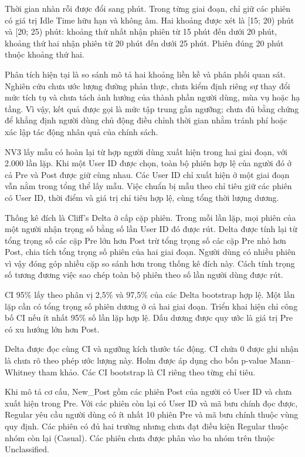 \documentclass[conference,a4paper]{IEEEtran}
\begin{document}
Thời gian nhàn rỗi được đổi sang phút. Trong từng giai đoạn, chỉ giữ các phiên có giá trị Idle Time hữu hạn và không âm. Hai khoảng được xét là [15; 20) phút và [20; 25) phút: khoảng thứ nhất nhận phiên từ 15 phút đến dưới 20 phút, khoảng thứ hai nhận phiên từ 20 phút đến dưới 25 phút. Phiên đúng 20 phút thuộc khoảng thứ hai.

Phân tích hiện tại là so sánh mô tả hai khoảng liền kề và phân phối quan sát. Nghiên cứu chưa ước lượng đường phản thực, chưa kiểm định riêng sự thay đổi mức tích tụ và chưa tách ảnh hưởng của thành phần người dùng, mùa vụ hoặc hạ tầng. Vì vậy, kết quả được gọi là mức tập trung gần ngưỡng; chưa đủ bằng chứng để khẳng định người dùng chủ động điều chỉnh thời gian nhằm tránh phí hoặc xác lập tác động nhân quả của chính sách.

NV3 lấy mẫu có hoàn lại từ hợp người dùng xuất hiện trong hai giai đoạn, với 2.000 lần lặp. Khi một User ID được chọn, toàn bộ phiên hợp lệ của người đó ở cả Pre và Post được giữ cùng nhau. Các User ID chỉ xuất hiện ở một giai đoạn vẫn nằm trong tổng thể lấy mẫu. Việc chuẩn bị mẫu theo chỉ tiêu giữ các phiên có User ID, thời điểm và giá trị chỉ tiêu hợp lệ, cùng tổng thời lượng dương.

Thống kê đích là Cliff’s Delta ở cấp cặp phiên. Trong mỗi lần lặp, mọi phiên của một người nhận trọng số bằng số lần User ID đó được rút. Delta được tính lại từ tổng trọng số các cặp Pre lớn hơn Post trừ tổng trọng số các cặp Pre nhỏ hơn Post, chia tích tổng trọng số phiên của hai giai đoạn. Người dùng có nhiều phiên vì vậy đóng góp nhiều cặp so sánh hơn trong thống kê đích này. Cách tính trọng số tương đương việc sao chép toàn bộ phiên theo số lần người dùng được rút.

CI 95\% lấy theo phân vị 2,5\% và 97,5\% của các Delta bootstrap hợp lệ. Một lần lặp cần có tổng trọng số phiên dương ở cả hai giai đoạn. Triển khai hiện chỉ công bố CI nếu ít nhất 95\% số lần lặp hợp lệ. Dấu dương được quy ước là giá trị Pre có xu hướng lớn hơn Post.

Delta được đọc cùng CI và ngưỡng kích thước tác động. CI chứa 0 được ghi nhận là chưa rõ theo phép ước lượng này. Holm được áp dụng cho bốn p-value Mann--Whitney tham khảo. Các CI bootstrap là CI riêng theo từng chỉ tiêu.

Khi mô tả cơ cấu, New\_Post gồm các phiên Post của người có User ID và chưa xuất hiện trong Pre. Với các phiên còn lại có User ID và mã bưu chính đọc được, Regular yêu cầu người dùng có ít nhất 10 phiên Pre và mã bưu chính thuộc vùng quy định. Các phiên có đủ hai trường nhưng chưa đạt điều kiện Regular thuộc nhóm còn lại (Casual). Các phiên chưa được phân vào ba nhóm trên thuộc Unclassified.
\end{document}
